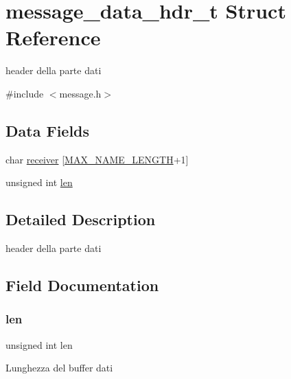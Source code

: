 \hypertarget{structmessage__data__hdr__t}{}\section{message\+\_\+data\+\_\+hdr\+\_\+t Struct Reference}
\label{structmessage__data__hdr__t}


header della parte dati  




{\ttfamily \#include $<$message.\+h$>$}

\subsection*{Data Fields}
\begin{DoxyCompactItemize}
\item 
char \hyperlink{structmessage__data__hdr__t_aabb098b2d9fd9305abddad8893b38843}{receiver} \mbox{[}\hyperlink{config_8h_a0c397a708cec89c74029582574516b30}{M\+A\+X\+\_\+\+N\+A\+M\+E\+\_\+\+L\+E\+N\+G\+TH}+1\mbox{]}
\item 
unsigned int \hyperlink{structmessage__data__hdr__t_a77124bd5f7e31e6fffc19f335da0c23f}{len}
\end{DoxyCompactItemize}


\subsection{Detailed Description}
header della parte dati 

\subsection{Field Documentation}
\mbox{\label{structmessage__data__hdr__t_a77124bd5f7e31e6fffc19f335da0c23f}} 
\subsubsection{\texorpdfstring{len}{len}}
{\footnotesize\ttfamily unsigned int len}

Lunghezza del buffer dati \mbox{\label{structmessage__data__hdr__t_aabb098b2d9fd9305abddad8893b38843}} 
